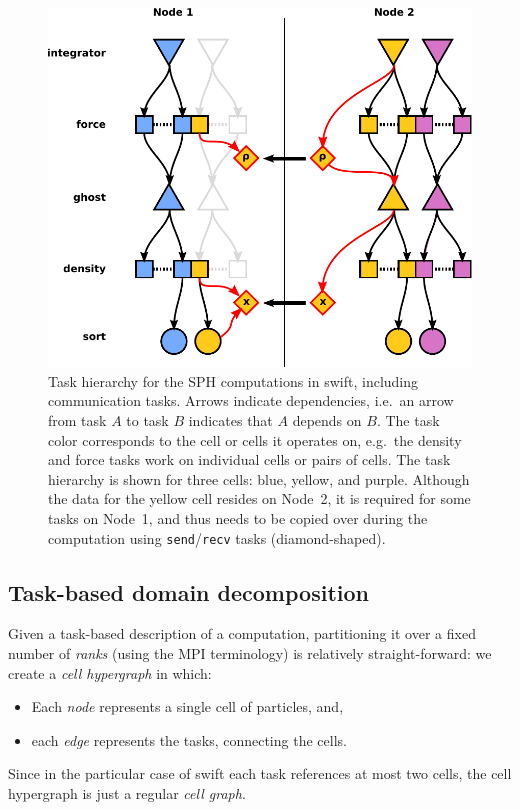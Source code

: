 \documentclass{sig-alternate-05-2015}
\newcommand{\swift}{{\sc swift}\xspace}
\begin{document}
\begin{figure}
\centering
\includegraphics[width=\columnwidth]{Figures/Hierarchy3}
\caption{Task hierarchy for the SPH computations in \swift,
  including communication tasks.
  Arrows indicate dependencies,
  i.e.~an arrow from task $A$ to task $B$ indicates that $A$
  depends on $B$. 
  The task color corresponds to the cell or
  cells it operates on, e.g.~the density and force tasks work
  on individual cells or pairs of cells.
  The task hierarchy is shown for three cells: blue, yellow,
  and purple. Although the data for the yellow cell resides on
  Node~2, it is required for some tasks on Node~1, and thus needs
  to be copied over  during
  the computation using {\tt send}/{\tt recv} tasks (diamond-shaped).}
\label{tasks}
\end{figure}  


\subsection{Task-based domain decomposition}

Given a task-based description of a computation, partitioning it over
a fixed number of {\em ranks} (using the MPI terminology)
is relatively straight-forward: we create
a {\em cell hypergraph} in which:
\begin{itemize}
  \item Each {\em node} represents a single cell of particles, and,
  \item each {\em edge} represents the tasks, connecting the
    cells.
\end{itemize}
Since in the particular case of \swift each task references at most
two cells, the cell hypergraph is just a regular {\em cell graph}.
\end{document}

